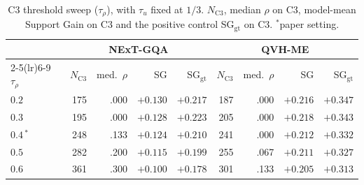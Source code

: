 \begin{table}[t]
\centering
\scriptsize
\setlength{\tabcolsep}{3pt}
\caption{C3 threshold sweep ($\tau_{\rho}$), with $\tau_u$ fixed at $1/3$. $N_{\text{C3}}$, median $\rho$ on C3, model-mean Support Gain on C3 and the positive control SG$_{\text{gt}}$ on C3. $^{\ast}$paper setting.}
\label{tab:a2_rho_sweep}
\begin{tabular}{l rrrr rrrr}
\toprule
& \multicolumn{4}{c}{NExT-GQA} & \multicolumn{4}{c}{QVH-ME} \\
\cmidrule(lr){2-5}\cmidrule(lr){6-9}
$\tau_{\rho}$ & $N_{\text{C3}}$ & med.\ $\rho$ & SG & SG$_{\text{gt}}$ & $N_{\text{C3}}$ & med.\ $\rho$ & SG & SG$_{\text{gt}}$ \\
\midrule
$0.2$ & 175 & .000 & $+0.130$ & $+0.217$ & 187 & .000 & $+0.216$ & $+0.347$ \\
$0.3$ & 195 & .000 & $+0.128$ & $+0.223$ & 205 & .000 & $+0.218$ & $+0.343$ \\
$0.4$\,$^{\ast}$ & 248 & .133 & $+0.124$ & $+0.210$ & 241 & .000 & $+0.212$ & $+0.332$ \\
$0.5$ & 282 & .200 & $+0.115$ & $+0.199$ & 255 & .067 & $+0.211$ & $+0.327$ \\
$0.6$ & 361 & .300 & $+0.100$ & $+0.178$ & 301 & .133 & $+0.205$ & $+0.313$ \\
\bottomrule
\end{tabular}
\end{table}
